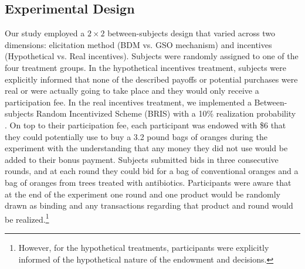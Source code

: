 \documentclass[12pt]{article}
\begin{document}
\subsection{Experimental Design}
Our study employed a $2\times2$ between-subjects design that varied across two dimensions: elicitation method (BDM vs. GSO mechanism) and incentives (Hypothetical vs. Real incentives). Subjects were randomly assigned to one of the four treatment groups. In the hypothetical incentives treatment, subjects were explicitly informed that none of the described payoffs or potential purchases were real or were actually going to take place and they would only receive a participation fee. In the real incentives treatment, we implemented a Between-subjects Random Incentivized Scheme (BRIS) with a 10\% realization probability \citep{ahles_testing_2024}. On top to their participation fee, each participant was endowed with \$6 that they could potentially use to buy a 3.2 pound bags of oranges during the experiment with the understanding that any money they did not use would be added to their bonus payment. Subjects submitted bids in three consecutive rounds, and at each round they could bid for a bag of conventional oranges and a bag of oranges from trees treated with antibiotics. Participants were aware that at the end of the experiment one round and one product would be randomly drawn as binding and any transactions regarding that product and round would be realized.\footnote{ However, for the hypothetical treatments, participants were explicitly informed of the hypothetical nature of the endowment and decisions.}  
\end{document}

